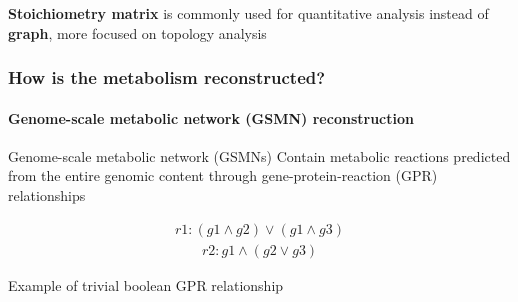 \documentclass[8pt]{beamer}
\begin{document}
\begin{frame}
{\begin{minipage}{0.5\textwidth}
\begin{tikzpicture}
\end{tikzpicture}

\end{minipage}

\begin{block}{}
\textbf{Stoichiometry matrix} is commonly used for quantitative analysis instead of \textbf{graph}, more focused on topology analysis
\end{block}


}


 \end{frame}

\begin{frame}
\frametitle{How is the metabolism reconstructed?}
\framesubtitle{Genome-scale metabolic network (GSMN) reconstruction}
\vspace{-0.3cm}
\begin{exampleblock}{Genome-scale metabolic network (GSMNs)}
Contain metabolic reactions predicted from the entire genomic content through gene-protein-reaction (GPR) relationships \tiny \citep{Thiele.2010}
\end{exampleblock}
\begin{minipage}{0.3\textwidth}
\begin{align*}
    r1 : (g1 \land g2) \lor (g1 \land g3)
\end{align*}
\begin{align*}
    r2 : g1 \land (g2 \lor g3)
\end{align*}

Example of trivial boolean GPR relationship


\end{minipage}
\end{frame}
\end{document}
